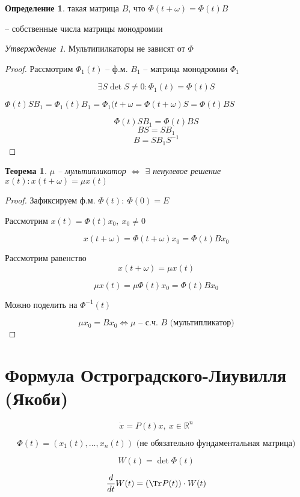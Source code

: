 \documentclass[a4paper]{article}
\theoremstyle{indented}
\newtheorem*{theorem}{Теорема}
\theoremstyle{definition}
\newtheorem*{defn}{Определение}
\theoremstyle{remark}
\newtheorem*{stat}{Утверждение}
\begin{document}
\begin{defn}
   такая матрица 
  $B$, что $\Phi(t+\omega) = \Phi(t)B$
  
    -- собственные числа матрицы монодромии
\end{defn}
\begin{stat}
  Мультипилкаторы не зависят от $\Phi$
\end{stat}
\begin{proof}
  Рассмотрим $\Phi_1(t)$ -- ф.м. $B_1$ -- матрица монодромии $\Phi_1$

  \[\exists S \det S \neq 0: \Phi_1(t) = \Phi(t) S\]

  $\Phi(t) S B_1 = \Phi_1(t)B_1 = \Phi_1(t + \omega = \Phi(t+\omega)S = \Phi(t)B S$

  \[\Phi(t) SB_1 = \Phi(t)B S\]
  \[BS = SB_1\]
  \[B = SB_1S^{-1}\]
\end{proof}
\begin{theorem}

  $\mu$ -- мультипликатор $\Leftrightarrow$ $\exists$ ненулевое решение $x(t): x(t+\omega) = \mu x(t)$
\end{theorem}
\begin{proof}
  Зафиксируем ф.м. $\Phi(t): \ \Phi(0) = E$

  Рассмотрим $x(t) = \Phi(t)x_0, \ x_0 \neq 0$

  $$x(t + \omega) = \Phi(t+\omega)x_0 = \Phi(t)Bx_0$$

  Рассмотрим равенство
  $$x(t+\omega) = \mu x(t)$$

  $$\mu x(t) = \mu \Phi(t) x_0 = \Phi(t) Bx_0$$

  Можно поделить на $\Phi^{-1}(t)$

  $$\mu x_0 = Bx_0 \Leftrightarrow \mu \text{ -- с.ч. $B$ (мультипликатор)}$$
\end{proof}

\section{Формула Остроградского-Лиувилля (Якоби)}

\[\dot x = P(t) x, \ x \in \mathbb{R}^n\]

\[\Phi(t) = (x_1(t), \ldots , x_n(t)) \text{ (не обязательно фундаментальная матрица)}\]

\[W(t) = \det \Phi (t)\]

\[\frac{d}{dt}W(t) = (\Tr P(t)) \cdot W(t)\]
\end{document}
